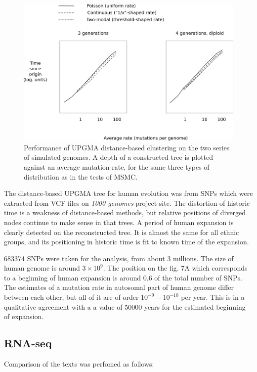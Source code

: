 \documentclass[12pt,aps]{revtex4}
\begin{document}
\begin{figure}[h]
\centerline{\includegraphics[width=0.8\columnwidth]{fig_upgma.png}}
\caption{Performance of UPGMA distance-based clustering on the two series of simulated genomes. A depth of a constructed tree is plotted against an average mutation rate, for the same three types of distribution as in the tests of MSMC.}
\label{fig_upgma}
\end{figure}

The distance-based UPGMA tree for human evolution was from SNPs which were extracted from VCF files on \textit{1000 genomes} project site. The distortion of historic time is a weakness of distance-based methods, but relative positions of diverged nodes continue to make sense in that trees. A period of human expansion is clearly detected on the reconstructed tree. It is almost the same for all ethnic groups, and its positioning in historic time is fit to known time of the expansion. 

683374 SNPs were taken for the analysis, from about 3 millions. The size of human genome is around $3 \times 10^9$. The position on the fig. 7A which corresponds to a beginning of human expansion is around 0.6 of the total number of SNPs. The estimates of a mutation rate in autosomal part of human genome differ between each other, but all of it are of order $10^{-9} - 10^{-10}$ per year. This is in a qualitative agreement with a a value of 50000 years for the estimated beginning of expansion. 

\subsection{RNA-seq}

Comparison of the texts was perfomed as follows:
\end{document}

